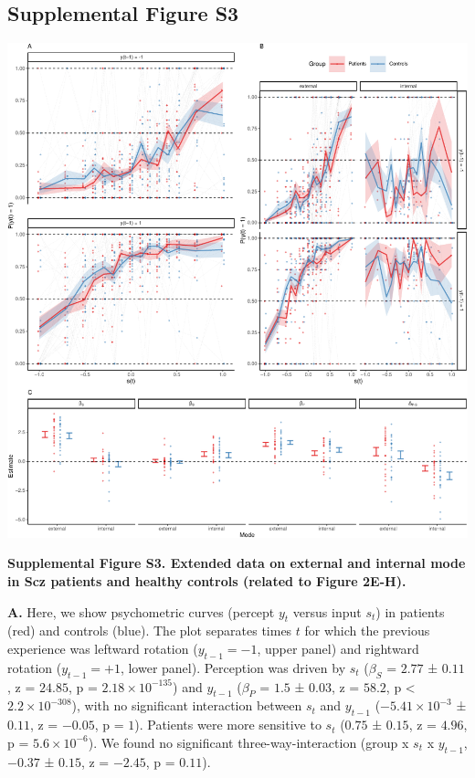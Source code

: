 \documentclass[
]{article}
\begin{document}
\newpage

\hypertarget{supplemental-figure-s3}{%
\subsection{Supplemental Figure S3}\label{supplemental-figure-s3}}

\includegraphics{modes_ketamine_scz_files/figure-latex/rev_Supplemental_Figure_S3-1.pdf}

\textbf{Supplemental Figure S3. Extended data on external and internal
mode in Scz patients and healthy controls (related to Figure 2E-H).}

\textbf{A.} Here, we show psychometric curves (percept \(y_t\) versus
input \(s_t\)) in patients (red) and controls (blue). The plot separates
times \(t\) for which the previous experience was leftward rotation
(\(y_{t-1} = -1\), upper panel) and rightward rotation
(\(y_{t-1} = +1\), lower panel). Perception was driven by \(s_t\)
(\(\beta_S\) = \(2.77\) ± \(0.11\), z = \(24.85\), p =
\(\ensuremath{2.18\times 10^{-135}}\)) and \(y_{t-1}\) (\(\beta_{P}\) =
\(1.5\) ± \(0.03\), z = \(58.2\), p < \(\ensuremath{2.2\times 10^{-308}}\)), with no significant
interaction between \(s_t\) and \(y_{t-1}\)
(\(\ensuremath{-5.41\times 10^{-3}}\) ± \(0.11\), z = \(-0.05\), p =
\(1\)). Patients were more sensitive to \(s_t\) (\(0.75\) ± \(0.15\), z
= \(4.96\), p = \(\ensuremath{5.6\times 10^{-6}}\)). We found no
significant three-way-interaction (group x \(s_t\) x \(y_{t-1}\),
\(-0.37\) ± \(0.15\), z = \(-2.45\), p = \(0.11\)).
\end{document}
